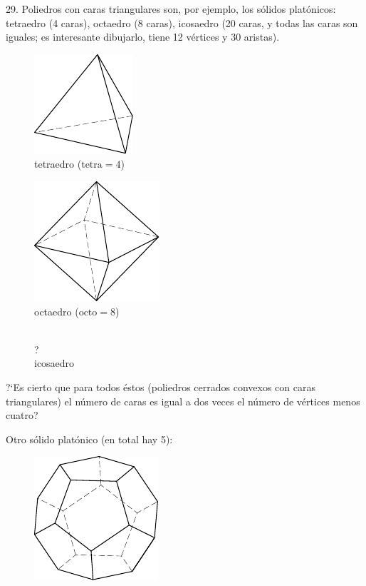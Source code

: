 \begin{problem}{29.}
	Poliedros con caras triangulares son, por ejemplo, los s\'olidos plat\'onicos: tetraedro (4 caras), octaedro (8 caras), icosaedro (20 caras, y todas las caras son iguales; es interesante dibujarlo, tiene 12 v\'ertices y 30 aristas).
	\begin{figure}
		\footnotesize
		\null\hfill
		\parbox{0.3\linewidth}{\centering\includegraphics{resources/taskbook-131}\\tetraedro ($\text{tetra}= 4$)}
		\hfill
		\parbox{0.3\linewidth}{\centering\includegraphics{resources/taskbook-132}\\octaedro ($\text{octo}= 8$)}
		\hfill\null\\
		{\Huge ?}\\icosaedro
	\end{figure}
	?`Es cierto que para todos \'estos (poliedros cerrados convexos con caras triangulares) el n\'umero de caras es igual a dos veces el n\'umero de v\'ertices menos cuatro?

	Otro s\'olido plat\'onico (en total hay 5):
	\begin{figure}
		\includegraphics{resources/taskbook-14}
	\end{figure}
\end{problem}

